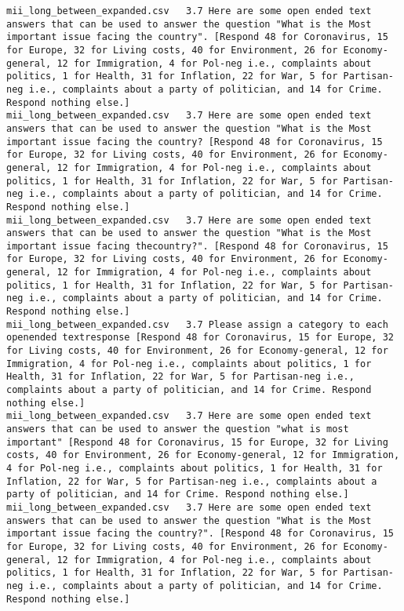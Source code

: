 \begin{lstlisting}[label=lst:promptvariants]
mii_long_between_expanded.csv	3.7	Here are some open ended text answers that can be used to answer the question "What is the Most important issue facing the country". [Respond 48 for Coronavirus, 15 for Europe, 32 for Living costs, 40 for Environment, 26 for Economy-general, 12 for Immigration, 4 for Pol-neg i.e., complaints about politics, 1 for Health, 31 for Inflation, 22 for War, 5 for Partisan-neg i.e., complaints about a party of politician, and 14 for Crime. Respond nothing else.]
mii_long_between_expanded.csv	3.7	Here are some open ended text answers that can be used to answer the question "What is the Most important issue facing the country? [Respond 48 for Coronavirus, 15 for Europe, 32 for Living costs, 40 for Environment, 26 for Economy-general, 12 for Immigration, 4 for Pol-neg i.e., complaints about politics, 1 for Health, 31 for Inflation, 22 for War, 5 for Partisan-neg i.e., complaints about a party of politician, and 14 for Crime. Respond nothing else.]
mii_long_between_expanded.csv	3.7	Here are some open ended text answers that can be used to answer the question "What is the Most important issue facing thecountry?". [Respond 48 for Coronavirus, 15 for Europe, 32 for Living costs, 40 for Environment, 26 for Economy-general, 12 for Immigration, 4 for Pol-neg i.e., complaints about politics, 1 for Health, 31 for Inflation, 22 for War, 5 for Partisan-neg i.e., complaints about a party of politician, and 14 for Crime. Respond nothing else.]
mii_long_between_expanded.csv	3.7	Please assign a category to each openended textresponse [Respond 48 for Coronavirus, 15 for Europe, 32 for Living costs, 40 for Environment, 26 for Economy-general, 12 for Immigration, 4 for Pol-neg i.e., complaints about politics, 1 for Health, 31 for Inflation, 22 for War, 5 for Partisan-neg i.e., complaints about a party of politician, and 14 for Crime. Respond nothing else.]
mii_long_between_expanded.csv	3.7	Here are some open ended text answers that can be used to answer the question "what is most important" [Respond 48 for Coronavirus, 15 for Europe, 32 for Living costs, 40 for Environment, 26 for Economy-general, 12 for Immigration, 4 for Pol-neg i.e., complaints about politics, 1 for Health, 31 for Inflation, 22 for War, 5 for Partisan-neg i.e., complaints about a party of politician, and 14 for Crime. Respond nothing else.]
mii_long_between_expanded.csv	3.7	Here are some open ended text answers that can be used to answer the question "What is the Most important issue facing the country?". [Respond 48 for Coronavirus, 15 for Europe, 32 for Living costs, 40 for Environment, 26 for Economy-general, 12 for Immigration, 4 for Pol-neg i.e., complaints about politics, 1 for Health, 31 for Inflation, 22 for War, 5 for Partisan-neg i.e., complaints about a party of politician, and 14 for Crime. Respond nothing else.]

\end{lstlisting}
